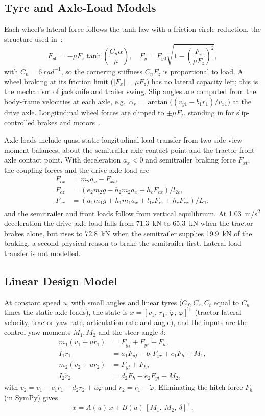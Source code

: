 \documentclass[conference]{IEEEtran}
\begin{document}
\subsection{Tyre and Axle-Load Models}
Each wheel's lateral force follows the tanh law with a friction-circle reduction, the structure used in~\cite{erdinc2023}:
\begin{equation}
F_{y0}=-\mu F_z\tanh\!\left(\frac{C_n\alpha}{\mu}\right),\quad
F_y=F_{y0}\sqrt{1-\left(\frac{F_x}{\mu F_z}\right)^2},
\label{eq:tyre}
\end{equation}
with $C_n=\SI{6}{rad^{-1}}$, so the cornering stiffness $C_nF_z$ is proportional to load. A wheel braking at its friction limit ($|F_x|=\mu F_z$) has no lateral capacity left; this is the mechanism of jackknife and trailer swing. Slip angles are computed from the body-frame velocities at each axle, e.g.\ $\alpha_r=\arctan\!\big((v_{y1}-b_1r_1)/v_{x1}\big)$ at the drive axle. Longitudinal wheel forces are clipped to $\pm\mu F_z$, standing in for slip-controlled brakes and motors~\cite{ivanov2015}.

Axle loads include quasi-static longitudinal load transfer from two side-view moment balances, about the semitrailer axle contact point and the tractor front-axle contact point. With deceleration $a_x<0$ and semitrailer braking force $F_{xt}$, the coupling forces and the drive-axle load are
\begin{align}
F_{cx}&=m_2a_x-F_{xt},\\
F_{cz}&=\left(e_2m_2g-h_2m_2a_x+h_cF_{cx}\right)/l_{2c},\\
F_{zr}&=\left(a_1m_1g+h_1m_1a_x+l_{1c}F_{cz}+h_cF_{cx}\right)/L_1,
\end{align}
and the semitrailer and front loads follow from vertical equilibrium. At \SI{1.03}{m/s^2} deceleration the drive-axle load falls from \SI{71.3}{kN} to \SI{65.3}{kN} when the tractor brakes alone, but rises to \SI{72.8}{kN} when the semitrailer supplies \SI{19.9}{kN} of the braking, a second physical reason to brake the semitrailer first. Lateral load transfer is not modelled.

\subsection{Linear Design Model}
At constant speed $u$, with small angles and linear tyres ($C_f,C_r,C_t$ equal to $C_n$ times the static axle loads), the state is $x=[v_1,\,r_1,\,\dot\varphi,\,\varphi]^\top$ (tractor lateral velocity, tractor yaw rate, articulation rate and angle), and the inputs are the control yaw moments $M_1,M_2$ and the steer angle $\delta$:
\begin{align}
m_1(\dot v_1+ur_1)&=F_{yf}+F_{yr}-F_h,\\
I_1\dot r_1&=a_1F_{yf}-b_1F_{yr}+c_1F_h+M_1,\\
m_2(\dot v_2+ur_2)&=F_{yt}+F_h,\\
I_2\dot r_2&=d_2F_h-e_2F_{yt}+M_2,
\end{align}
with $v_2=v_1-c_1r_1-d_2r_2+u\varphi$ and $r_2=r_1-\dot\varphi$. Eliminating the hitch force $F_h$ (in SymPy) gives
\begin{equation}
\dot x=A(u)\,x+B(u)\,[M_1,\ M_2,\ \delta]^\top .
\end{equation}
\end{document}
